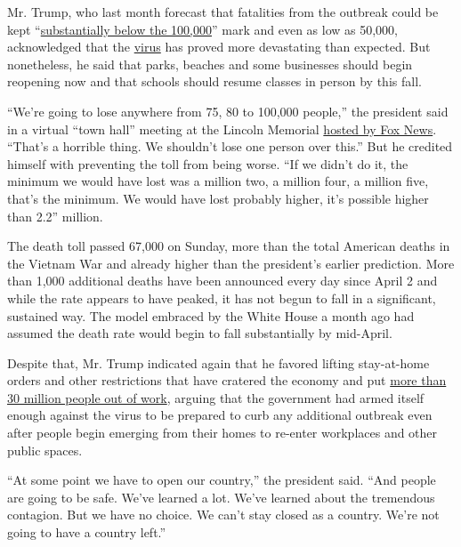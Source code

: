 Mr. Trump, who last month forecast that fatalities from the outbreak
could be kept
``\href{https://www.whitehouse.gov/briefings-statements/remarks-president-trump-vice-president-pence-members-coronavirus-task-force-press-briefing-24/}{substantially
below the 100,000}'' mark and even as low as 50,000, acknowledged that
the
\href{https://www.nytimes3xbfgragh.onion/2020/05/04/us/politics/trump-coronavirus-death-toll.html}{virus}
has proved more devastating than expected. But nonetheless, he said that
parks, beaches and some businesses should begin reopening now and that
schools should resume classes in person by this fall.

``We're going to lose anywhere from 75, 80 to 100,000 people,'' the
president said in a virtual ``town hall'' meeting at the Lincoln
Memorial
\href{https://www.foxnews.com/politics/trump-virtual-town-hall-america-together-returning-to-work-coronavirus-lincoln-memorial}{hosted
by Fox News}. ``That's a horrible thing. We shouldn't lose one person
over this.'' But he credited himself with preventing the toll from being
worse. ``If we didn't do it, the minimum we would have lost was a
million two, a million four, a million five, that's the minimum. We
would have lost probably higher, it's possible higher than 2.2''
million.

The death toll passed 67,000 on Sunday, more than the total American
deaths in the Vietnam War and already higher than the president's
earlier prediction. More than 1,000 additional deaths have been
announced every day since April 2 and while the rate appears to have
peaked, it has not begun to fall in a significant, sustained way. The
model embraced by the White House a month ago had assumed the death rate
would begin to fall substantially by mid-April.

Despite that, Mr. Trump indicated again that he favored lifting
stay-at-home orders and other restrictions that have cratered the
economy and put
\href{https://www.nytimes3xbfgragh.onion/2020/04/30/business/economy/coronavirus-unemployment-claims.html}{more
than 30 million people out of work}, arguing that the government had
armed itself enough against the virus to be prepared to curb any
additional outbreak even after people begin emerging from their homes to
re-enter workplaces and other public spaces.

``At some point we have to open our country,'' the president said. ``And
people are going to be safe. We've learned a lot. We've learned about
the tremendous contagion. But we have no choice. We can't stay closed as
a country. We're not going to have a country left.''

